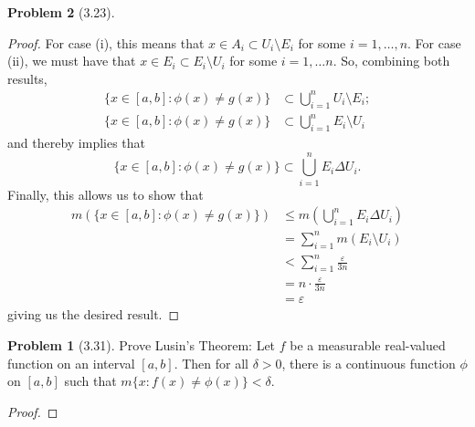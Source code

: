 \documentclass[12pt]{article}
\renewcommand{\epsilon}{\varepsilon}
\theoremstyle{definition}
\newtheorem{problem}{Problem}
\begin{document}
\begin{problem}[3.23]
\begin{enumerate}[label = \alph{*}.]
\begin{proof}
                For case (i), this means that \( x \in A_i \subset U_i \setminus E_i \) for some \( i = 1, \ldots, n \). For case (ii), we must have that \( x \in E_i \subset E_i \setminus U_i \) for some \( i = 1, \ldots n \). So, combining both results, 
                    \begin{align*}
                        \{ x \in [a,b]: \phi(x) \neq g(x) \} &\subset \bigcup_{i=1}^{n} U_i \setminus E_i; \\
                        \{ x \in [a,b]: \phi(x) \neq g(x) \} &\subset \bigcup_{i=1}^{n} E_i \setminus U_i
                    \end{align*}
                and thereby implies that 
                    \[
                        \{ x \in [a,b]: \phi(x) \neq g(x) \} \subset \bigcup_{i=1}^{n} E_i \Delta U_i.
                    \]
                Finally, this allows us to show that 
                    \begin{align*}
                        m \left( \{ x \in [a,b]: \phi(x) \neq g(x) \} \right) &\leq m \left( \bigcup_{i=1}^{n} E_i \Delta U_i \right) \\
                        &= \sum_{i=1}^{n} m \left( E_i \setminus U_i \right) \\
                        &< \sum_{i=1}^{n} \frac{\epsilon}{3n} \\
                        &= n \cdot \frac{\epsilon}{3n} \\
                        &= \epsilon
                    \end{align*}
                giving us the desired result.
            \end{proof}
    \end{enumerate}

\begin{problem}[3.31]

    Prove Lusin's Theorem: Let \( f \) be a measurable real-valued function on an interval \( [a,b] \). Then for all \( \delta > 0 \), there is a continuous function \( \phi \) on \( [a,b] \) such that \( m \{x: f(x) \neq \phi(x) \} < \delta \). 

    \begin{proof}


\end{proof}
\end{problem}
\end{problem}
\end{document}
